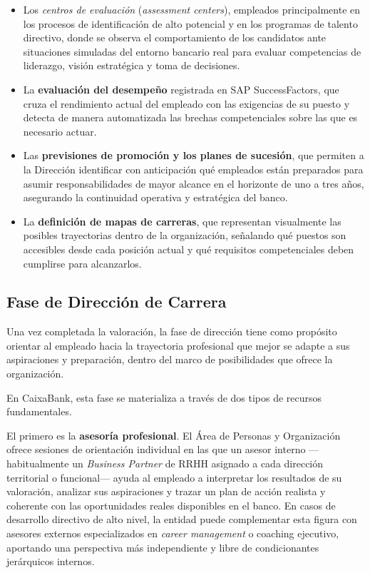 \begin{itemize}
    \item Los \textit{centros de evaluación} (\textit{assessment centers}), empleados
          principalmente en los procesos de identificación de alto potencial y en los programas de
          talento directivo, donde se observa el comportamiento de los candidatos ante situaciones
          simuladas del entorno bancario real para evaluar competencias de liderazgo, visión
          estratégica y toma de decisiones.
    \item La \textbf{evaluación del desempeño} registrada en SAP SuccessFactors, que cruza
          el rendimiento actual del empleado con las exigencias de su puesto y detecta de manera
          automatizada las brechas competenciales sobre las que es necesario actuar.
    \item Las \textbf{previsiones de promoción y los planes de sucesión}, que permiten a la
          Dirección identificar con anticipación qué empleados están preparados para asumir
          responsabilidades de mayor alcance en el horizonte de uno a tres años, asegurando la
          continuidad operativa y estratégica del banco.
    \item La \textbf{definición de mapas de carreras}, que representan visualmente las posibles
          trayectorias dentro de la organización, señalando qué puestos son accesibles desde cada
          posición actual y qué requisitos competenciales deben cumplirse para alcanzarlos.
\end{itemize}

\subsection{Fase de Dirección de Carrera}

Una vez completada la valoración, la fase de dirección tiene como propósito orientar al empleado
hacia la trayectoria profesional que mejor se adapte a sus aspiraciones y preparación, dentro del
marco de posibilidades que ofrece la organización.

En CaixaBank, esta fase se materializa a través de dos tipos de recursos fundamentales.

El primero es la \textbf{asesoría profesional}. El Área de Personas y Organización ofrece sesiones
de orientación individual en las que un asesor interno —habitualmente un \textit{Business Partner}
de RRHH asignado a cada dirección territorial o funcional— ayuda al empleado a interpretar los
resultados de su valoración, analizar sus aspiraciones y trazar un plan de acción realista y
coherente con las oportunidades reales disponibles en el banco. En casos de desarrollo directivo
de alto nivel, la entidad puede complementar esta figura con asesores externos especializados en
\textit{career management} o coaching ejecutivo, aportando una perspectiva más independiente y
libre de condicionantes jerárquicos internos.


